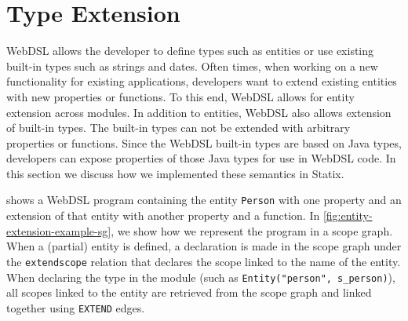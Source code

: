   \section{\label{sec:type-extension}Type Extension}

    WebDSL allows the developer to define types such as entities or use existing built-in types such as strings and dates. Often times, when working on a new functionality for existing applications, developers want to extend existing entities with new properties or functions. To this end, WebDSL allows for entity extension across modules. In addition to entities, WebDSL also allows extension of built-in types. The built-in types can not be extended with arbitrary properties or functions. Since the WebDSL built-in types are based on Java types, developers can expose properties of those Java types for use in WebDSL code. In this section we discuss how we implemented these semantics in Statix.

     shows a WebDSL program containing the entity \texttt{Person} with one property and an extension of that entity with another property and a function. In \cref{fig:entity-extension-example-sg}, we show how we represent the program in a scope graph. When a (partial) entity is defined, a declaration is made in the scope graph under the \texttt{extendscope} relation that declares the scope linked to the name of the entity. When declaring the type in the module (such as \texttt{Entity("person", s\_person)}), all scopes linked to the entity are retrieved from the scope graph and linked together using \texttt{EXTEND} edges.

